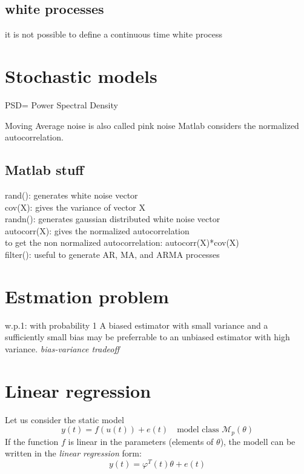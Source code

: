 \documentclass{book}
\begin{document}
\section{white processes}
it is not possible to define a continuous time white process

















\chapter{Stochastic models}


PSD= Power Spectral Density

Moving Average noise is also called pink noise
Matlab considers the normalized autocorrelation.


\section{Matlab stuff}
rand(): generates white noise vector\\
cov(X): gives the variance of vector X\\
randn(): generates gaussian distributed white noise vector\\
autocorr(X): gives the normalized autocorrelation\\
to get the non normalized autocorrelation: autocorr(X)*cov(X)\\
filter(): useful to generate AR, MA, and ARMA processes\\





\chapter{Estmation problem}
w.p.1: with probability 1
A biased estimator with small variance and a sufficiently small bias may be preferrable to an unbiased estimator with high variance. \emph{bias-variance tradeoff}

\chapter{Linear regression}
Let us consider the static model
\[
    y(t) = f(u(t))+e(t) \quad \text{model class } \mathcal{M}_p(\theta)
\]
If the function $f$ is linear in the parameters (elements of $\theta$), the modell can be written in the \emph{linear regression} form:
\[
    y(t) = \varphi^T(t)\theta+e(t)
\]
\end{document}
